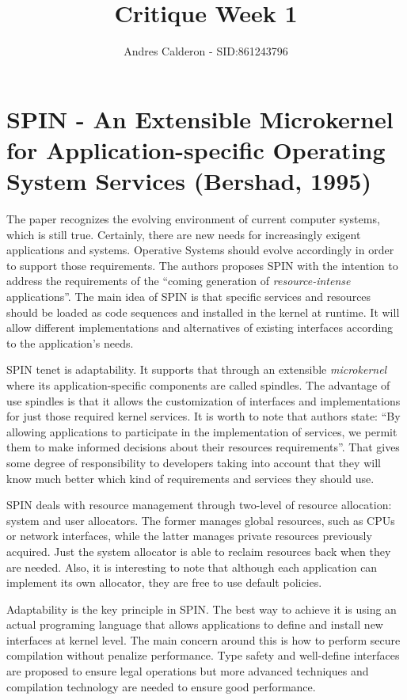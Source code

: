 \documentclass[a4paper,10pt]{scrartcl}
\title{Critique Week 1}
\author{Andres Calderon - SID:861243796}
\begin{document}
\maketitle
\section*{SPIN - An Extensible Microkernel for Application-specific Operating System Services (Bershad, 1995)}
The paper recognizes the evolving environment of current computer systems, which is still true.  Certainly, there are new needs for increasingly exigent applications and systems. Operative Systems should evolve accordingly in order to support those requirements. The authors proposes SPIN with the intention to address the requirements of the ``coming generation of \textit{resource-intense} applications''. The main idea of SPIN is that specific services and resources should be loaded as code sequences and installed in the kernel at runtime. It will allow different implementations and alternatives of existing interfaces according to the application's needs.

SPIN tenet is adaptability.  It supports that through an extensible \textit{microkernel} where its application-specific components are called spindles.  The advantage of use spindles is that it allows the customization of interfaces and implementations for just those required kernel services. It is worth to note that authors state: ``By allowing applications to participate in the implementation of services, we permit them to make informed decisions about their resources requirements''.  That gives some degree of responsibility to developers taking into account that they will know much better which kind of requirements and services they should use.

SPIN deals with resource management through two-level of resource allocation: system and user allocators.  The former manages global resources, such as CPUs or network interfaces, while the latter manages private resources previously acquired.  Just the system allocator is able to reclaim resources back when they are needed. Also, it is interesting to note that although each application can implement its own allocator, they are free to use default policies.

Adaptability is the key principle in SPIN. The best way to achieve it is using an actual programing language that allows applications to define and install new interfaces at kernel level. The main concern around this is how to perform secure compilation without penalize performance.  Type safety and well-define interfaces are proposed to ensure legal operations but more advanced techniques and compilation technology are needed to ensure good performance.
\end{document}
